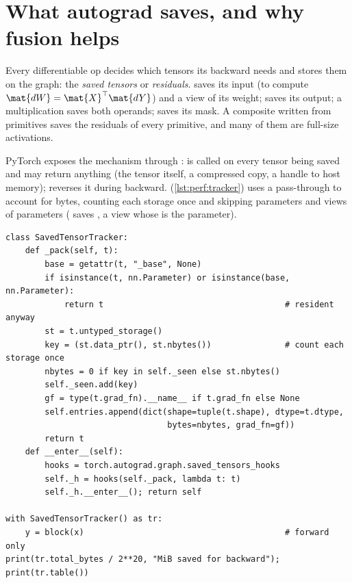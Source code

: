 \section{What autograd saves, and why fusion helps}\label{sec:perf:residuals}

Every differentiable op decides which tensors its backward needs and stores them on the graph:
the \emph{saved tensors} or \emph{residuals}.  saves its input (to compute
$\mat{dW}=\mat{X}^\top\mat{dY}$) and a view of its weight;  saves its output; a
multiplication saves both operands;  saves its mask. A composite written from
primitives saves the residuals of every primitive, and many of them are full-size activations.

PyTorch exposes the mechanism through :  is called on every tensor being saved and may return anything (the tensor
itself, a compressed copy, a handle to host memory);  reverses it during backward.
 (\cref{lst:perf:tracker}) uses a pass-through  to account for
bytes, counting each storage once and skipping parameters and views of parameters (
saves , a view whose  is the parameter).

\begin{lstlisting}[caption={Accounting for residuals with saved-tensor hooks (abridged from \texttt{llmsys/perf.py}).},label={lst:perf:tracker}]
class SavedTensorTracker:
    def _pack(self, t):
        base = getattr(t, "_base", None)
        if isinstance(t, nn.Parameter) or isinstance(base, nn.Parameter):
            return t                                     # resident anyway
        st = t.untyped_storage()
        key = (st.data_ptr(), st.nbytes())               # count each storage once
        nbytes = 0 if key in self._seen else st.nbytes()
        self._seen.add(key)
        gf = type(t.grad_fn).__name__ if t.grad_fn else None
        self.entries.append(dict(shape=tuple(t.shape), dtype=t.dtype,
                                 bytes=nbytes, grad_fn=gf))
        return t
    def __enter__(self):
        hooks = torch.autograd.graph.saved_tensors_hooks
        self._h = hooks(self._pack, lambda t: t)
        self._h.__enter__(); return self

with SavedTensorTracker() as tr:
    y = block(x)                                         # forward only
print(tr.total_bytes / 2**20, "MiB saved for backward"); print(tr.table())
\end{lstlisting}

